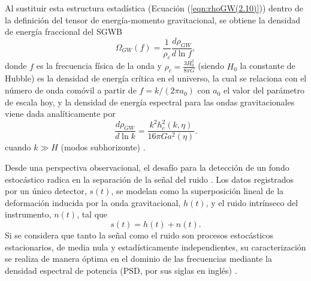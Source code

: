 Al sustituir esta estructura estadística (Ecuación (\ref{eqn:rhoGW(2.10)})) dentro de la definición del tensor de energía-momento gravitacional, se obtiene la densidad de energía fraccional del SGWB
\begin{equation}
    \Omega_{GW} (f) = \frac{1}{\rho_c} \frac{d \rho_{GW}}{d \ln f},
\end{equation}
donde $f$ es la frecuencia física de la onda y $\displaystyle \rho_c = \frac{3 H_0^2}{8 \pi G}$ (siendo $H_0$ la constante de Hubble) es la densidad de energía crítica en el universo, la cual se relaciona con el número de onda comóvil a partir de $f = k/(2 \pi a_0)$ con $a_0$ el valor del parámetro de escala hoy, y la densidad de energía espectral para las ondas gravitacionales viene dada analíticamente por
\begin{equation}
    \frac{d \rho_{GW}}{d \ln k} = \frac{k^2 h_c^2 \left( k, \eta \right)}{16 \pi G a^2 (\eta)}. 
\end{equation}
cuando $k \gg H$ (modos subhorizonte) \cite{Caprini_2020}.

Desde una perspectiva observacional, el desafío para la detección de un fondo estocástico radica en la separación de la señal del ruido \cite{Christensen_2018}. Los datos registrados por un único detector, $s(t)$, se modelan como la superposición lineal de la deformación inducida por la onda gravitacional, $h(t)$, y el ruido intrínseco del instrumento, $n(t)$, tal que
\begin{equation}
    s(t) = h(t) + n(t).
\end{equation}
Si se considera que tanto la señal como el ruido son procesos estocásticos estacionarios, de media nula y estadísticamente independientes, su caracterización se realiza de manera óptima en el dominio de las frecuencias mediante la densidad espectral de potencia (PSD, por sus siglas en inglés) \cite{Christensen_2018}. 


